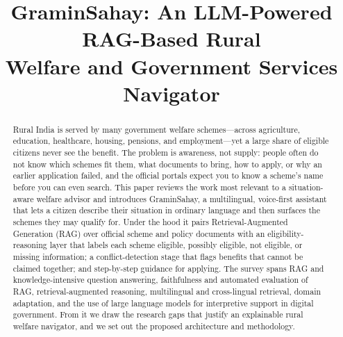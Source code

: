 \documentclass[conference]{IEEEtran}
\begin{document}
\title{GraminSahay: An LLM-Powered RAG-Based Rural\\ Welfare and Government Services Navigator}

\author{
\and
{}
\and
{}
\and
{}
}

\maketitle

\begin{abstract}
Rural India is served by many government welfare schemes---across agriculture, education, healthcare, housing, pensions, and employment---yet a large share of eligible citizens never see the benefit. The problem is awareness, not supply: people often do not know which schemes fit them, what documents to bring, how to apply, or why an earlier application failed, and the official portals expect you to know a scheme's name before you can even search. This paper reviews the work most relevant to a situation-aware welfare advisor and introduces GraminSahay, a multilingual, voice-first assistant that lets a citizen describe their situation in ordinary language and then surfaces the schemes they may qualify for. Under the hood it pairs Retrieval-Augmented Generation (RAG) over official scheme and policy documents with an eligibility-reasoning layer that labels each scheme eligible, possibly eligible, not eligible, or missing information; a conflict-detection stage that flags benefits that cannot be claimed together; and step-by-step guidance for applying. The survey spans RAG and knowledge-intensive question answering, faithfulness and automated evaluation of RAG, retrieval-augmented reasoning, multilingual and cross-lingual retrieval, domain adaptation, and the use of large language models for interpretive support in digital government. From it we draw the research gaps that justify an explainable rural welfare navigator, and we set out the proposed architecture and methodology.
\end{abstract}
\end{document}
